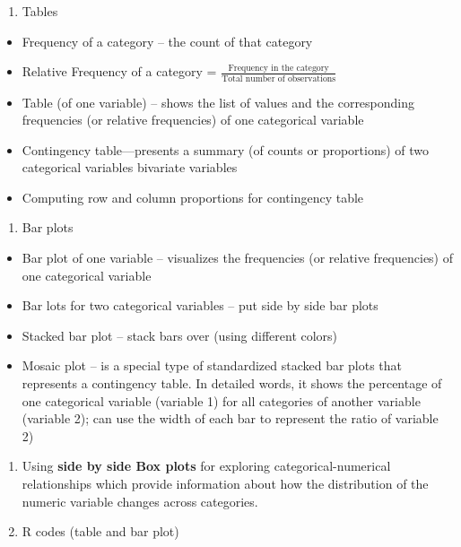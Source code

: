 \documentclass[
]{book}
\providecommand{\tightlist}{%
  \setlength{\itemsep}{0pt}\setlength{\parskip}{0pt}}
\begin{document}
\begin{enumerate}
\def\labelenumi{\arabic{enumi}.}
\tightlist
\item
  Tables
\end{enumerate}

\begin{itemize}
\tightlist
\item
  Frequency of a category -- the count of that category
\item
  Relative Frequency of a category = \(\frac{\text{Frequency in the category}}{\text{Total number of observations}}\)
\item
  Table (of one variable) -- shows the list of values and the corresponding frequencies (or relative frequencies) of one categorical variable
\item
  Contingency table---presents a summary (of counts or proportions) of two categorical variables bivariate variables
\item
  Computing row and column proportions for contingency table
\end{itemize}

\begin{enumerate}
\def\labelenumi{\arabic{enumi}.}
\setcounter{enumi}{1}
\tightlist
\item
  Bar plots
\end{enumerate}

\begin{itemize}
\tightlist
\item
  Bar plot of one variable -- visualizes the frequencies (or relative frequencies) of one categorical variable
\item
  Bar lots for two categorical variables -- put side by side bar plots
\item
  Stacked bar plot -- stack bars over (using different colors)
\item
  Mosaic plot -- is a special type of standardized stacked bar plots that represents a contingency table. In detailed words, it shows the percentage of one categorical variable (variable 1) for all categories of another variable (variable 2); can use the width of each bar to represent the ratio of variable 2)
\end{itemize}

\begin{enumerate}
\def\labelenumi{\arabic{enumi}.}
\setcounter{enumi}{2}
\item
  Using \textbf{side by side Box plots} for exploring categorical-numerical relationships which provide information about how the distribution of the numeric variable changes across categories.
\item
  R codes (table and bar plot)
\end{enumerate}
\end{document}
